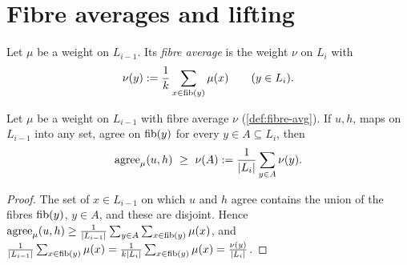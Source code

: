 \section{Fibre averages and lifting}

\begin{definition}\label{def:fibre-avg}
Let $\mu$ be a weight on $L_{i-1}$. Its \emph{fibre average} is the weight $\nu$ on $L_i$ with
\[
\nu(y):=\frac1k\sum_{x\in\mathrm{fib}(y)}\mu(x)\qquad(y\in L_i).
\]
\end{definition}

\begin{lemma}[Lifting]\label{lem:lift}
Let $\mu$ be a weight on $L_{i-1}$ with fibre average $\nu$ (\cref{def:fibre-avg}). If $u,h$, maps
on $L_{i-1}$ into any set, agree on $\mathrm{fib}(y)$ for every $y\in A\subseteq L_i$, then
\[
\agree_\mu(u,h)\ \ge\ \nu(A):=\frac1{|L_i|}\sum_{y\in A}\nu(y).
\]
\end{lemma}

\begin{proof}
The set of $x\in L_{i-1}$ on which $u$ and $h$ agree contains the union of the fibres $\mathrm{fib}(y)$,
$y\in A$, and these are disjoint. Hence
$\mathrm{agree}_\mu(u,h)\ge\frac1{|L_{i-1}|}\sum_{y\in A}\sum_{x\in\mathrm{fib}(y)}\mu(x)$, and
$\frac1{|L_{i-1}|}\sum_{x\in\mathrm{fib}(y)}\mu(x)=\frac1{k|L_i|}\sum_{x\in\mathrm{fib}(y)}\mu(x)=\frac{\nu(y)}{|L_i|}$.
\end{proof}
